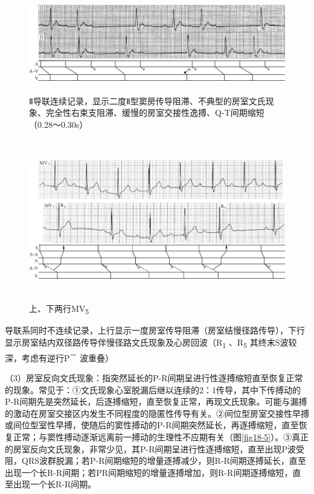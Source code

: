 \begin{figure}[!htbp]
 \centering
 \includegraphics[width=5.80208in,height=1.70833in]{./images/Image00304.jpg}
 \captionsetup{justification=centering}
 \caption{Ⅱ导联连续记录，显示二度Ⅱ型窦房传导阻滞、不典型的房室文氏现象、完全性右束支阻滞、缓慢的房室交接性逸搏、Q-T间期缩短（0.28～0.30s）}
 \label{fig18-3}
  \end{figure} 

\begin{figure}[!htbp]
 \centering
 \includegraphics[width=6.02083in,height=2.78125in]{./images/Image00305.jpg}
 \captionsetup{justification=centering}
 \caption{上、下两行MV\textsubscript{5}}
 \label{fig18-4}
  \end{figure} 
导联系同时不连续记录，上行显示一度房室传导阻滞（房室结慢径路传导），下行显示房室结内双径路传导伴慢径路文氏现象及心房回波（R\textsubscript{1}
、R\textsubscript{5} 其终末S波较深，考虑有逆行P\textsuperscript{－}
波重叠）

（3）房室反向文氏现象：指突然延长的P-R间期呈进行性逐搏缩短直至恢复正常的现象。常见于：①文氏现象心室脱漏后继以连续的2：1传导，其中下传搏动的P-R间期先是突然延长，后逐搏缩短，直至恢复正常，再现文氏现象。可能与漏搏的激动在房室交接区内发生不同程度的隐匿性传导有关。②间位型房室交接性早搏或间位型室性早搏，使随后的窦性搏动的P-R间期突然延长，再逐搏缩短，直至恢复正常；与窦性搏动逐渐远离前一搏动的生理性不应期有关（图\ref{fig18-5}）。③真正的房室反向文氏现象，非常少见，其P-R间期呈进行性逐搏缩短，直至出现P波受阻，QRS波群脱漏；若P-R间期缩短的增量逐搏减少，则R-R间期逐搏延长，直至出现一个长R-R间期；若PR间期缩短的增量逐搏增加，则R-R间期逐搏缩短，直至出现一个长R-R间期。

